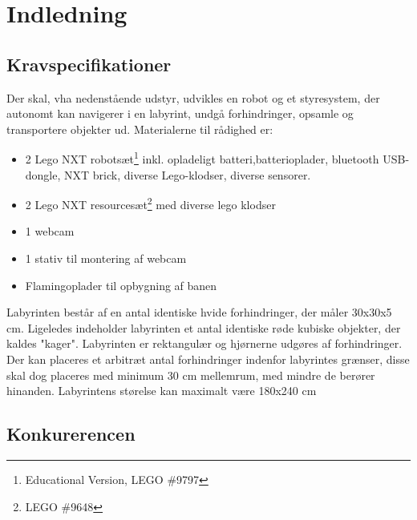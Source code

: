 \chapter{Indledning}

\section{Kravspecifikationer}
Der skal, vha nedenstående udstyr, udvikles en robot og et styresystem, der autonomt kan navigerer i en labyrint, undgå forhindringer, opsamle og transportere objekter ud.
Materialerne til rådighed er:
\begin{itemize}
\item 2 Lego NXT robotsæt\footnote{Educational Version, LEGO \#9797} inkl. opladeligt batteri,batterioplader, bluetooth USB-dongle, NXT brick, diverse Lego-klodser, diverse sensorer.
\item 2 Lego NXT resourcesæt\footnote{LEGO \#9648} med diverse lego klodser
\item 1 webcam
\item 1 stativ til montering af webcam
\item Flamingoplader til opbygning af banen
\end{itemize}

Labyrinten består af en antal identiske hvide forhindringer, der måler 30x30x5 cm. Ligeledes indeholder labyrinten et antal identiske røde kubiske objekter, der kaldes "kager". Labyrinten er rektangulær og hjørnerne udgøres af forhindringer. Der kan placeres et arbitræt antal forhindringer indenfor labyrintes grænser, disse skal dog placeres med minimum 30 cm mellemrum, med mindre de berører hinanden. Labyrintens størelse kan maximalt være 180x240 cm

\section{Konkurerencen}